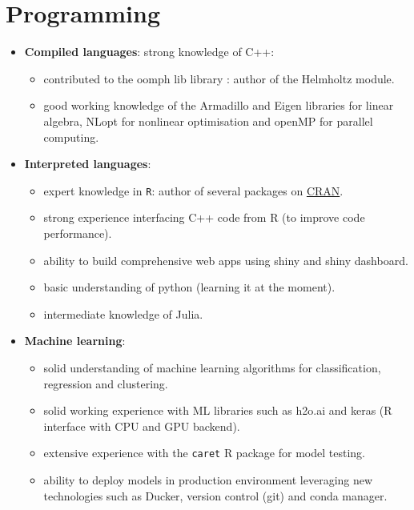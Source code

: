 \documentclass[a4paper,twoside,11pt]{article}
\begin{document}
\section{Programming}
\label{sec:orgb93acdc}
\begin{itemize}
\item \textbf{Compiled languages}: strong knowledge of C++:
\begin{itemize}
\item contributed to the oomph lib library \citep{heil2006oomph}: author of the
Helmholtz module.
\item good working knowledge of the Armadillo \citep{sanderson2016armadillo} and
Eigen \citep{jacob2012eigen} libraries for linear algebra, NLopt
\citep{johnsonnlopt} for nonlinear optimisation and openMP
\citep{dagum1998openmp} for parallel computing.
\end{itemize}

\item \textbf{Interpreted languages}: 
\begin{itemize}
\item expert knowledge in \texttt{R}: author of several packages on \href{https://cran.r-project.org/}{CRAN}.
\item strong experience interfacing C++ code from R (to improve code performance).
\item ability to build comprehensive web apps using shiny and shiny dashboard.
\item basic understanding of python (learning it at the moment).
\item intermediate knowledge of Julia.
\end{itemize}

\item \textbf{Machine learning}: 
\begin{itemize}
\item solid understanding of machine learning algorithms for classification,
regression and clustering.
\item solid working experience with ML libraries such as h2o.ai
\citep{candel2016deep} and keras \citep{chollet2015keras}(R interface with
CPU and GPU backend).
\item extensive experience with the \texttt{caret} R package \citep{kuhn2008caret} for
model testing.
\item ability to deploy models in production environment leveraging new
technologies such as Ducker, version control (git) and conda manager.
\end{itemize}


\end{itemize}
\end{document}
